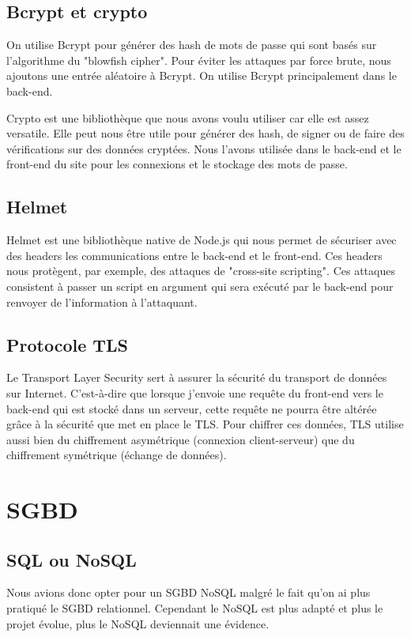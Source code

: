 \documentclass[a4paper,12pt]{report}
\begin{document}
\subsection{Bcrypt et crypto}
	On utilise Bcrypt pour générer des hash de mots de passe qui sont basés sur l'algorithme du "blowfish cipher". Pour éviter les attaques par force brute, nous ajoutons une entrée aléatoire à Bcrypt. On utilise Bcrypt principalement dans le back-end.

Crypto est une bibliothèque que nous avons voulu utiliser car elle est assez versatile. Elle peut nous être utile pour générer des hash, de signer ou de faire des vérifications sur des données cryptées. Nous l'avons utilisée dans le back-end et le front-end du site pour les connexions et le stockage des mots de passe.

\newpage
\subsection{Helmet}
	Helmet est une bibliothèque native de Node.js qui nous permet de sécuriser avec des headers les communications entre le back-end et le front-end. Ces headers nous protègent, par exemple, des attaques de "cross-site scripting". Ces attaques consistent à passer un script en argument qui sera exécuté par le back-end pour renvoyer de l'information à l'attaquant.

\subsection{Protocole TLS}
	Le Transport Layer Security sert à assurer la sécurité du transport de données sur Internet. C'est-à-dire que lorsque j'envoie une requête du front-end vers le back-end qui est stocké dans un serveur, cette requête ne pourra être altérée grâce à la sécurité que met en place le TLS. Pour chiffrer ces données, TLS utilise aussi bien du chiffrement asymétrique (connexion client-serveur) que du chiffrement symétrique (échange de données).
	
\section{SGBD}

\subsection{SQL ou NoSQL}
Nous avions donc opter pour un SGBD NoSQL malgré le fait qu'on ai plus pratiqué le SGBD relationnel. Cependant le NoSQL est plus adapté et plus le projet évolue, plus le NoSQL deviennait une évidence.
\end{document}
